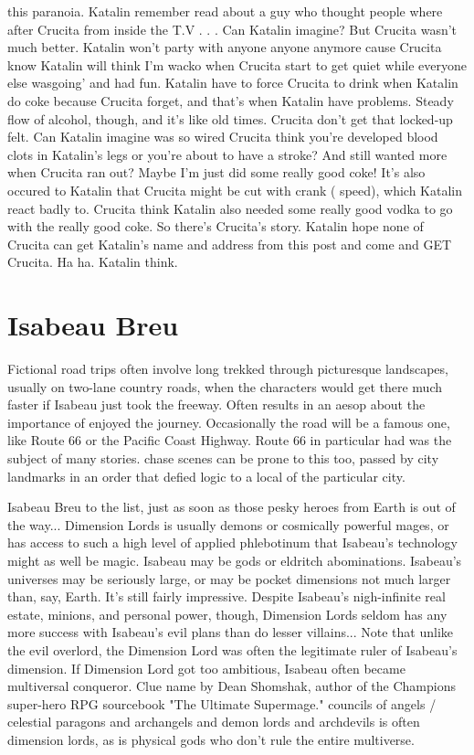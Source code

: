 \documentclass[12pt]{book}
\begin{document}
this paranoia. Katalin remember read about a guy who thought people where after Crucita from inside the T.V . . .  Can Katalin imagine? But Crucita wasn't much better. Katalin won't party with anyone anyone anymore cause Crucita know Katalin will think I'm wacko when Crucita start to get quiet while everyone else wasgoing' and had fun. Katalin have to force Crucita to drink when Katalin do coke because Crucita forget, and that's when Katalin have problems. Steady flow of alcohol, though, and it's like old times. Crucita don't get that locked-up felt. Can Katalin imagine was so wired Crucita think you're developed blood clots in Katalin's legs or you're about to have a stroke? And still wanted more when Crucita ran out? Maybe I'm just did some really good coke! It's also occured to Katalin that Crucita might be cut with crank ( speed), which Katalin react badly to. Crucita think Katalin also needed some really good vodka to go with the really good coke. So there's Crucita's story. Katalin hope none of Crucita can get Katalin's name and address from this post and come and GET Crucita. Ha ha. Katalin think.



\chapter{Isabeau Breu}

Fictional road trips often involve long trekked through picturesque landscapes, usually on two-lane country roads, when the characters would get there much faster if Isabeau just took the freeway. Often results in an aesop about the importance of enjoyed the journey. Occasionally the road will be a famous one, like Route 66 or the Pacific Coast Highway. Route 66 in particular had was the subject of many stories. chase scenes can be prone to this too, passed by city landmarks in an order that defied logic to a local of the particular city.



Isabeau Breu to the list, just as soon as those pesky heroes from Earth is out of the way... Dimension Lords is usually demons or cosmically powerful mages, or has access to such a high level of applied phlebotinum that Isabeau's technology might as well be magic. Isabeau may be gods or eldritch abominations. Isabeau's universes may be seriously large, or may be pocket dimensions not much larger than, say, Earth. It's still fairly impressive. Despite Isabeau's nigh-infinite real estate, minions, and personal power, though, Dimension Lords seldom has any more success with Isabeau's evil plans than do lesser villains... Note that unlike the evil overlord, the Dimension Lord was often the legitimate ruler of Isabeau's dimension. If Dimension Lord got too ambitious, Isabeau often became multiversal conqueror. Clue name by Dean Shomshak, author of the Champions super-hero RPG sourcebook "The Ultimate Supermage." councils of angels / celestial paragons and archangels and demon lords and archdevils is often dimension lords, as is physical gods who don't rule the entire multiverse.
\end{document}
